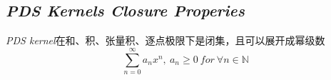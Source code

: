 \subsection*{\textsl{PDS Kernels Closure Properies}}

\begin{mdframed}
    \begin{theorem}
        \textsl{PDS kernel}在和、积、张量积、逐点极限下是闭集，且可以展开成幂级数
        \begin{equation}
            \sum^{\infty}_{n=0}a_nx^n,\ a_n\geqslant 0\ for\ \forall n\in \mathbb{N}
        \end{equation}
    \end{theorem}
\end{mdframed}

